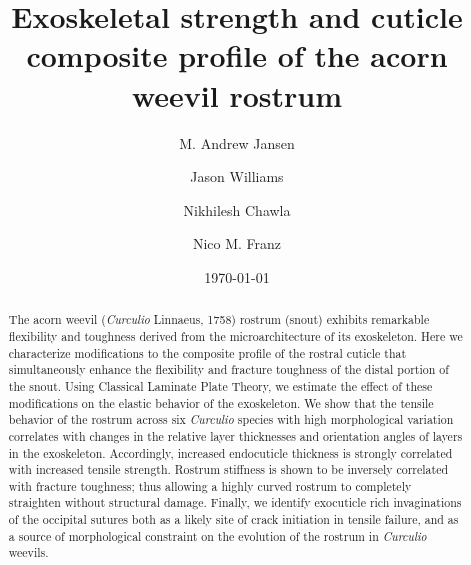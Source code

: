 \documentclass[twocolumn, linenumbers, superscriptaddress, nofootinbib]{revtex4-1}
\begin{document}
	\begin{abstract}
		The acorn weevil (\textit{Curculio} Linnaeus, 1758) rostrum (snout) exhibits remarkable flexibility and toughness derived from the microarchitecture of its exoskeleton.
		Here we characterize modifications to the composite profile of the rostral cuticle that simultaneously enhance the flexibility and fracture toughness of the distal portion of the snout.
		Using Classical Laminate Plate Theory, we estimate the effect of these modifications on the elastic behavior of the exoskeleton.
		We show that the tensile behavior of the rostrum across six \textit{Curculio} species with high morphological variation correlates with changes in the relative layer thicknesses and orientation angles of layers in the exoskeleton.
		Accordingly, increased endocuticle thickness is strongly correlated with increased tensile strength.
		Rostrum stiffness is shown to be inversely correlated with fracture toughness; thus allowing a highly curved rostrum to completely straighten without structural damage.
		Finally, we identify exocuticle rich invaginations of the occipital sutures both as a likely site of crack initiation in tensile failure, and as a source of morphological constraint on the evolution of the rostrum in \textit{Curculio} weevils.
		
	\end{abstract}
	
	{\title{Exoskeletal strength and cuticle composite profile of the acorn weevil rostrum}
	\date{\today}
	
	\author{M. Andrew Jansen}
	\author{Jason Williams}
	\author{Nikhilesh Chawla}
	\author{Nico M. Franz}
		
	\maketitle
	}
\end{document}
